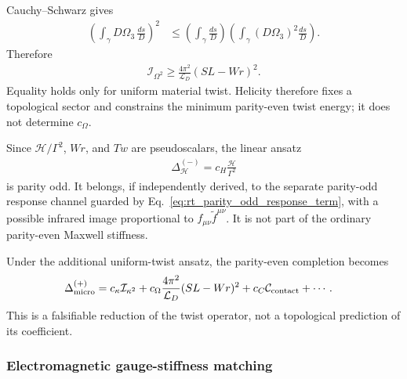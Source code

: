 Cauchy--Schwarz gives
\begin{align}
    \left(
        \int_\gamma D\Omega_3\,\frac{ds}{D}
    \right)^2
    &\leq
    \left(
        \int_\gamma\frac{ds}{D}
    \right)
    \left(
        \int_\gamma(D\Omega_3)^2\frac{ds}{D}
    \right).
\end{align}
Therefore
\begin{align}
    \boxed{
    \mathcal I_{\Omega^2}
    \geq
    \frac{4\pi^2}{\mathcal L_D}
    (SL-Wr)^2.
    }
    \label{eq:rt_alpha_twist_energy_bound_v0835}
\end{align}
Equality holds only for uniform material twist.  Helicity therefore fixes a
topological sector and constrains the minimum parity-even twist energy; it
does not determine \(c_\Omega\).

Since \(\mathcal H/\Gamma^2\), \(Wr\), and \(Tw\) are pseudoscalars, the linear
ansatz
\begin{align}
    \Delta_{\mathcal H}^{(-)}
    =
    c_H\frac{\mathcal H}{\Gamma^2}
\end{align}
is parity odd.  It belongs, if independently derived, to the separate
parity-odd response channel guarded by
Eq.~\eqref{eq:rt_parity_odd_response_term}, with a possible infrared image
proportional to \(f_{\mu\nu}\widetilde f^{\mu\nu}\).  It is not part of the
ordinary parity-even Maxwell stiffness.

Under the additional uniform-twist ansatz, the parity-even completion becomes
\begin{align}
    \Delta_{\rm micro}^{(+)}
    &=
    c_\kappa\mathcal I_{\kappa^2}
    +
    c_\Omega
    \frac{4\pi^2}{\mathcal L_D}
    (SL-Wr)^2
    +
    c_C\mathcal C_{\rm contact}
    +\cdots .
    \label{eq:rt_alpha_uniform_twist_completion_v0835}
\end{align}
This is a falsifiable reduction of the twist operator, not a topological
prediction of its coefficient.

\subsubsection{Electromagnetic gauge-stiffness matching}

